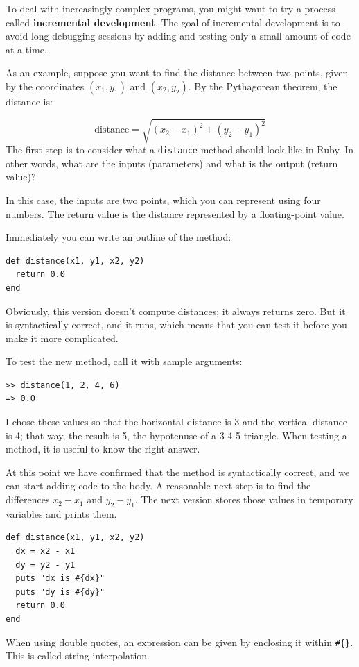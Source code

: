 \documentclass[10pt]{book}
\begin{document}
To deal with increasingly complex programs,
you might want to try a process called
{\bf incremental development}.  The goal of incremental development
is to avoid long debugging sessions by adding and testing only
a small amount of code at a time.

As an example, suppose you want to find the distance between two
points, given by the coordinates $(x_1, y_1)$ and $(x_2, y_2)$.
By the Pythagorean theorem, the distance is:

\begin{displaymath}
\mathrm{distance} = \sqrt{(x_2 - x_1)^2 + (y_2 - y_1)^2}
\end{displaymath}
%
The first step is to consider what a {\tt distance} method should
look like in Ruby.  In other words, what are the inputs (parameters)
and what is the output (return value)?

In this case, the inputs are two points, which you can represent
using four numbers.  The return value is the distance represented by
a floating-point value.

Immediately you can write an outline of the method:

\begin{verbatim}
def distance(x1, y1, x2, y2)
  return 0.0
end
\end{verbatim}
%
Obviously, this version doesn't compute distances; it always returns
zero.  But it is syntactically correct, and it runs, which means that
you can test it before you make it more complicated.

To test the new method, call it with sample arguments:

\begin{verbatim}
>> distance(1, 2, 4, 6)
=> 0.0
\end{verbatim}
%
I chose these values so that the horizontal distance is 3 and the
vertical distance is 4; that way, the result is 5, the hypotenuse 
of a 3-4-5 triangle.  When testing a method, it is
useful to know the right answer.

At this point we have confirmed that the method is syntactically
correct, and we can start adding code to the body.
A reasonable next step is to find the differences
$x_2 - x_1$ and $y_2 - y_1$.  The next version stores those values in
temporary variables and prints them.

\begin{verbatim}
def distance(x1, y1, x2, y2)
  dx = x2 - x1
  dy = y2 - y1
  puts "dx is #{dx}"
  puts "dy is #{dy}"
  return 0.0
end
\end{verbatim}
%
When using double quotes, an expression can be given by enclosing
it within {\tt \#\{\}}. This is called string interpolation.
\end{document}
